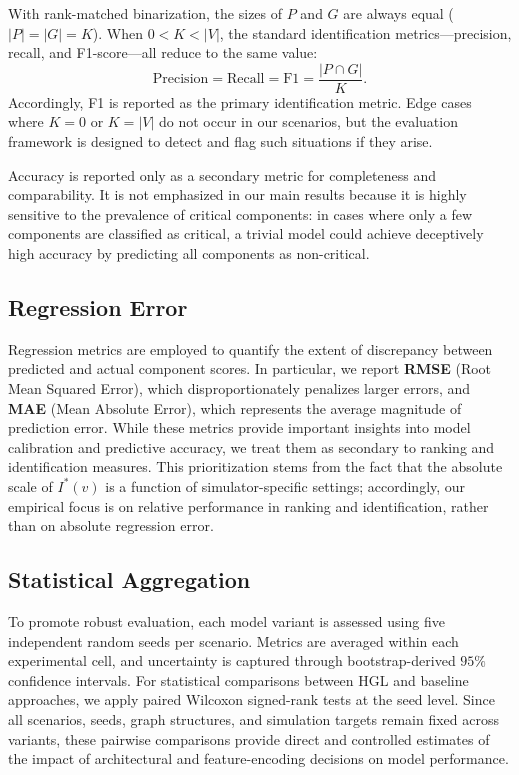 \documentclass[sigconf,9pt,anonymous]{acmart}
\begin{document}
With rank-matched binarization, the sizes of $P$ and $G$ are always equal ($|P|=|G|=K$). When $0<K<|V|$, the standard identification metrics—precision, recall, and F1-score—all reduce to the same value:
\[
\text{Precision}=\text{Recall}=\text{F1}=\frac{|P\cap G|}{K}.
\]
Accordingly, F1 is reported as the primary identification metric. Edge cases where $K=0$ or $K=|V|$ do not occur in our scenarios, but the evaluation framework is designed to detect and flag such situations if they arise.

Accuracy is reported only as a secondary metric for completeness and comparability. It is not emphasized in our main results because it is highly sensitive to the prevalence of critical components: in cases where only a few components are classified as critical, a trivial model could achieve deceptively high accuracy by predicting all components as non-critical.

\subsection{Regression Error}

Regression metrics are employed to quantify the extent of discrepancy between predicted and actual component scores. In particular, we report \textbf{RMSE} (Root Mean Squared Error), which disproportionately penalizes larger errors, and \textbf{MAE} (Mean Absolute Error), which represents the average magnitude of prediction error. While these metrics provide important insights into model calibration and predictive accuracy, we treat them as secondary to ranking and identification measures. This prioritization stems from the fact that the absolute scale of $I^*(v)$ is a function of simulator-specific settings; accordingly, our empirical focus is on relative performance in ranking and identification, rather than on absolute regression error.

\subsection{Statistical Aggregation}

To promote robust evaluation, each model variant is assessed using five independent random seeds per scenario. Metrics are averaged within each experimental cell, and uncertainty is captured through bootstrap-derived $95\%$ confidence intervals. For statistical comparisons between HGL and baseline approaches, we apply paired Wilcoxon signed-rank tests at the seed level. Since all scenarios, seeds, graph structures, and simulation targets remain fixed across variants, these pairwise comparisons provide direct and controlled estimates of the impact of architectural and feature-encoding decisions on model performance.
\end{document}
